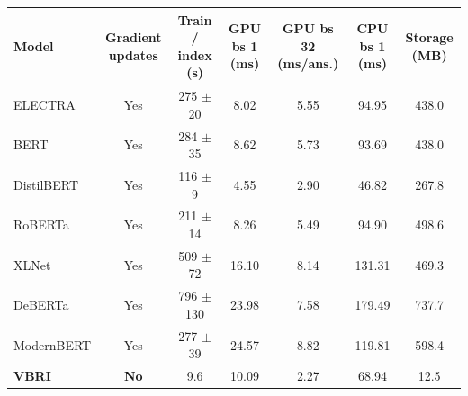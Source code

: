 \begin{tabular}{@{}lcccccc@{}}
\toprule
\textbf{Model} & \textbf{Gradient updates} & \textbf{Train / index (s)} & \textbf{GPU bs 1 (ms)} & \textbf{GPU bs 32 (ms/ans.)} & \textbf{CPU bs 1 (ms)} & \textbf{Storage (MB)} \\
\midrule
ELECTRA & Yes & 275 $\pm$ 20 & 8.02 & 5.55 & 94.95 & 438.0 \\
BERT & Yes & 284 $\pm$ 35 & 8.62 & 5.73 & 93.69 & 438.0 \\
DistilBERT & Yes & 116 $\pm$ 9 & 4.55 & 2.90 & 46.82 & 267.8 \\
RoBERTa & Yes & 211 $\pm$ 14 & 8.26 & 5.49 & 94.90 & 498.6 \\
XLNet & Yes & 509 $\pm$ 72 & 16.10 & 8.14 & 131.31 & 469.3 \\
DeBERTa & Yes & 796 $\pm$ 130 & 23.98 & 7.58 & 179.49 & 737.7 \\
ModernBERT & Yes & 277 $\pm$ 39 & 24.57 & 8.82 & 119.81 & 598.4 \\
\midrule
\textbf{VBRI} & \textbf{No} & 9.6 & 10.09 & 2.27 & 68.94 & 12.5 \\
\bottomrule
\end{tabular}
